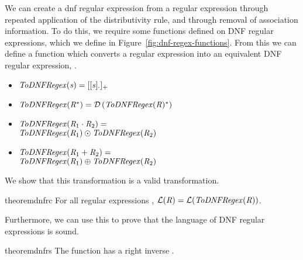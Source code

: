 
We can create a dnf regular expression from a regular expression through repeated
application of the distributivity rule, and through removal of association information.  To do this, we require some functions defined on DNF regular expressions,
which we define in Figure~\ref{fig:dnf-regex-functions}.
From this we can define a function which converts a regular expression into
an equivalent DNF regular expression, \ToDNFRegex{}.
\begin{definition}
\leavevmode
\begin{itemize}
\item $\mathit{ToDNFRegex}(\mathit{s})=[[\mathit{s}]_{\cdot}]_{+}$
\item $\mathit{ToDNFRegex}(\mathit{R}^*) = \mathcal{D}\, (\mathit{ToDNFRegex}(\mathit{R})^*)$
\item $\mathit{ToDNFRegex}(\mathit{R}_1\cdot\mathit{R}_2) =$\\
\hspace*{1em}$\mathit{ToDNFRegex}(\mathit{R}_1)\odot\mathit{ToDNFRegex}(\mathit{R}_2)$
\item $\mathit{ToDNFRegex}(\mathit{R}_1+\mathit{R}_2) =$\\
\hspace*{1em}$\mathit{ToDNFRegex}(\mathit{R}_1)\oplus\mathit{ToDNFRegex}(\mathit{R}_2)$
\end{itemize}
\end{definition}
We show that this transformation is a valid transformation.
\begin{restatable}{theorem}{dnfrc}
\label{thm:completeness-dnf-lenses}
For all regular expressions \Regex{},
$\mathcal{L}(\mathit{R})=\mathcal{L}(\mathit{ToDNFRegex}(\mathit{R}))$.
\end{restatable}

Furthermore, we can use this to prove that the language of DNF regular expressions is sound.

\begin{restatable}{theorem}{dnfrs}
\label{thm:soundness-dnf-lenses}
The function \ToDNFRegex{} has a right inverse \FromDNFRegex{}.
\end{restatable}

